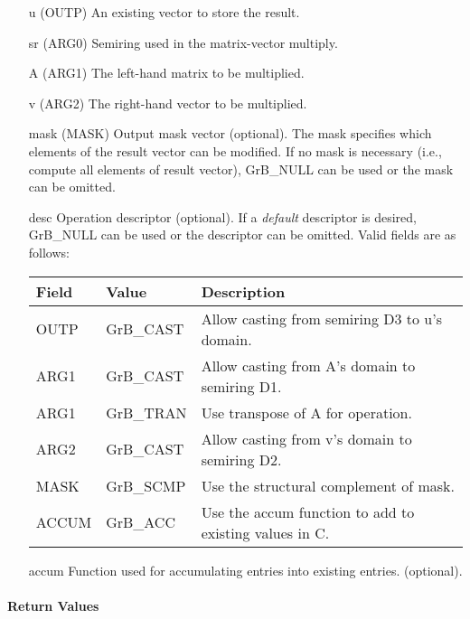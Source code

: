 \begin{itemize}[leftmargin=1.1in]
    \item[{\sf u}]    ({\sf OUTP}) An existing vector to store the result.
    \item[{\sf sr}]   ({\sf ARG0}) Semiring used in the matrix-vector multiply.
    \item[{\sf A}]    ({\sf ARG1}) The left-hand matrix to be multiplied.
    \item[{\sf v}]    ({\sf ARG2}) The right-hand vector to be multiplied.

    \item[{\sf mask}] ({\sf MASK}) Output mask vector (optional). The mask
    specifies which elements of the result vector can be modified.
    If no mask is necessary (i.e., compute all elements of result
    vector), {\sf GrB\_NULL} can be used or the mask can be omitted.

    \item[{\sf desc}]  Operation descriptor (optional). If a
    \emph{default} descriptor is desired, {\sf GrB\_NULL} can be
    used or the descriptor can be omitted. Valid fields are as follows: \\
    \begin{tabular}{lll}
    Field  & Value & Description \\
    \hline
    {\sf OUTP} & {\sf GrB\_CAST} & Allow casting from semiring D3 to {\sf u}'s domain. \\
    {\sf ARG1} & {\sf GrB\_CAST} & Allow casting from {\sf A}'s domain to semiring D1. \\
    {\sf ARG1} & {\sf GrB\_TRAN} & Use transpose of {\sf A} for operation. \\
    {\sf ARG2} & {\sf GrB\_CAST} & Allow casting from {\sf v}'s domain to semiring D2. \\
    {\sf MASK} & {\sf GrB\_SCMP} & Use the structural complement of {\sf mask}. \\
    {\sf ACCUM}& {\sf GrB\_ACC}  & Use the {\sf accum} function to add to existing values in {\sf C}.\\
    \end{tabular}

  	\item[{\sf accum}]  Function used for accumulating entries into existing  entries. (optional). 
\end{itemize}

\paragraph{Return Values}

